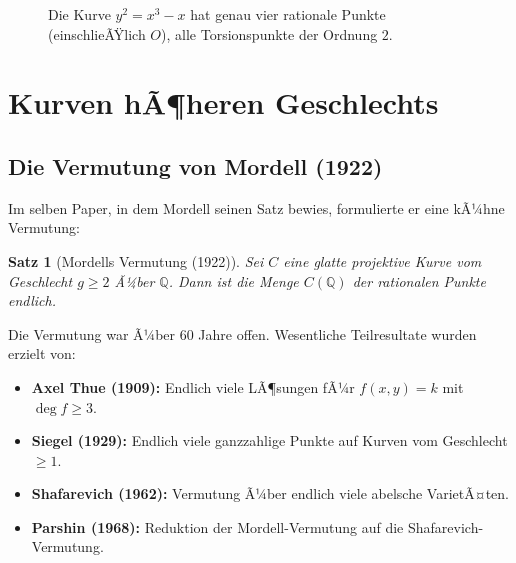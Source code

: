﻿\documentclass[12pt,a4paper]{article}
\theoremstyle{plain}
\newtheorem{theorem}{Satz}[section]
\theoremstyle{definition}
\theoremstyle{remark}
\newcommand{\Q}{\mathbb{Q}}
\newcommand{\Z}{\mathbb{Z}}
\begin{document}
\begin{figure}[H]
\centering
{}
\caption{Die Kurve $y^2 = x^3 - x$ hat genau vier rationale Punkte (einschlieÃŸlich $O$),
  alle Torsionspunkte der Ordnung $2$.}
\label{fig:torsion}
\end{figure}

\section{Kurven hÃ¶heren Geschlechts}

\subsection{Die Vermutung von Mordell (1922)}

Im selben Paper, in dem Mordell seinen Satz bewies, formulierte er eine kÃ¼hne Vermutung:

\begin{theorem}[Mordells Vermutung (1922)]\label{thm:mordell_verm}
Sei $C$ eine glatte projektive Kurve vom Geschlecht $g \geq 2$ Ã¼ber $\Q$.
Dann ist die Menge $C(\Q)$ der rationalen Punkte \emph{endlich}.
\end{theorem}

Die Vermutung war Ã¼ber 60 Jahre offen. Wesentliche Teilresultate wurden erzielt von:
\begin{itemize}
  \item \textbf{Axel Thue (1909):} Endlich viele LÃ¶sungen fÃ¼r $f(x,y)=k$ mit $\deg f \geq 3$.
  \item \textbf{Siegel (1929):} Endlich viele ganzzahlige Punkte auf Kurven vom Geschlecht $\geq 1$.
  \item \textbf{Shafarevich (1962):} Vermutung Ã¼ber endlich viele abelsche VarietÃ¤ten.
  \item \textbf{Parshin (1968):} Reduktion der Mordell-Vermutung auf die Shafarevich-Vermutung.
\end{itemize}
\end{document}
